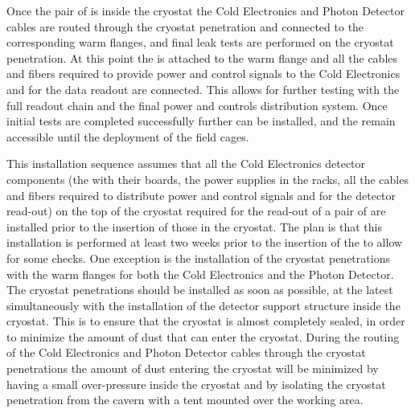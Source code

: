 Once the pair of  is inside the cryostat the Cold Electronics
and Photon Detector cables are routed through the cryostat penetration and
connected to the corresponding warm flanges, and final leak tests are performed
on the cryostat penetration. At this point the  is attached
to the warm flange and all the cables and fibers required to provide 
power and control signals to the Cold Electronics and for the data
readout are connected. This allows for further testing with the full 
 readout chain and the final power and controls distribution
system. Once initial tests are completed successfully further 
can be installed, and the  remain accessible until the 
deployment of the field cages.

This installation sequence assumes that all the Cold Electronics detector 
components (the  with their boards, the power supplies in 
the racks, all the cables and fibers required to distribute power and
control signals and for the detector read-out) on the top of the cryostat 
required for the read-out of a pair of  are installed prior 
to the insertion of those  in the cryostat. The plan is 
that this installation is performed at least two weeks prior to the 
insertion of the  to allow for some checks. One exception
is the installation of the cryostat penetrations with the warm flanges
for both the Cold Electronics and the Photon Detector. The cryostat
penetrations should be installed as soon as possible, at the latest
simultaneously with the installation of the detector support structure
inside the cryostat. This is to ensure that the cryostat is almost 
completely sealed, in order to minimize the amount of dust that can 
enter the cryostat. During the routing of the Cold Electronics and
Photon Detector cables through the cryostat penetrations the amount
of dust entering the cryostat will be minimized by having a small
over-pressure inside the cryostat and by isolating the cryostat penetration
from the cavern with a tent mounted over the working area.

